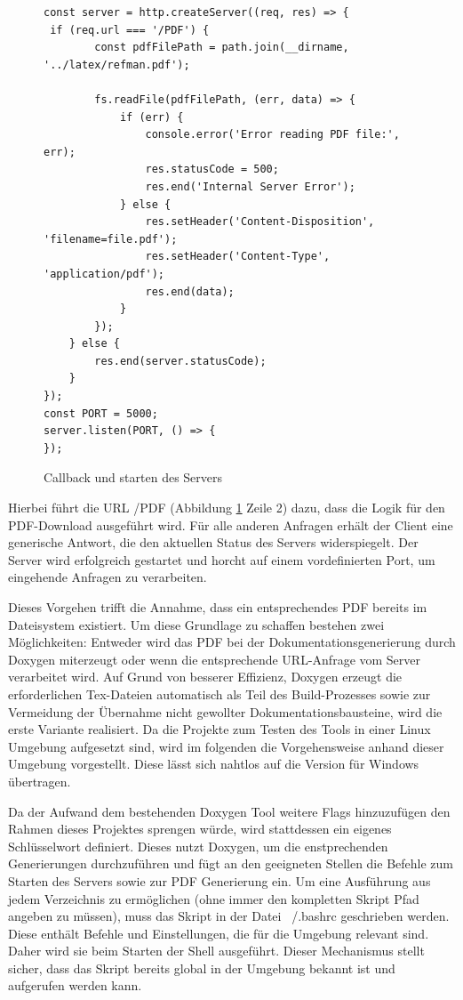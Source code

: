 \documentclass[11pt,a4paper]{report}
\begin{document}
\begin{figure}[H]
    \centering
    \begin{verbatim}
const server = http.createServer((req, res) => {
 if (req.url === '/PDF') {
        const pdfFilePath = path.join(__dirname, '../latex/refman.pdf');

        fs.readFile(pdfFilePath, (err, data) => {
            if (err) {
                console.error('Error reading PDF file:', err);
                res.statusCode = 500;
                res.end('Internal Server Error');
            } else {
                res.setHeader('Content-Disposition', 'filename=file.pdf');
                res.setHeader('Content-Type', 'application/pdf');
                res.end(data);
            }
        });
    } else {
        res.end(server.statusCode);
    }
});
const PORT = 5000;
server.listen(PORT, () => {
});
    \end{verbatim}
    \caption{Callback und starten des Servers}
    \label{code:Callback}
\end{figure}
\noindent
Hierbei führt die URL \glqq /PDF \grqq{} (Abbildung \ref{code:Callback} Zeile 2) dazu, dass die Logik für den PDF-Download ausgeführt wird. Für alle anderen Anfragen erhält der Client eine generische Antwort, die den aktuellen Status des Servers widerspiegelt. Der Server wird erfolgreich gestartet und horcht auf einem vordefinierten Port, um eingehende Anfragen zu verarbeiten.

\noindent
Dieses Vorgehen trifft die Annahme, dass ein entsprechendes PDF bereits im Dateisystem existiert. Um diese Grundlage zu schaffen bestehen zwei Möglichkeiten: Entweder wird das PDF bei der Dokumentationsgenerierung durch Doxygen miterzeugt oder wenn die entsprechende URL-Anfrage vom Server verarbeitet wird. Auf Grund von besserer Effizienz, Doxygen erzeugt die erforderlichen \glqq Tex\grqq{}-Dateien automatisch als Teil des Build-Prozesses sowie zur Vermeidung der Übernahme nicht gewollter Dokumentationsbausteine, wird die erste Variante realisiert. Da die Projekte zum Testen des Tools in einer \glqq Linux \grqq{} Umgebung aufgesetzt sind, wird im folgenden die Vorgehensweise anhand dieser Umgebung vorgestellt. Diese lässt sich nahtlos auf die Version für \glqq Windows \grqq{} übertragen.

\noindent
Da der Aufwand dem bestehenden Doxygen Tool weitere Flags hinzuzufügen den Rahmen dieses Projektes sprengen würde, wird stattdessen ein eigenes Schlüsselwort definiert. Dieses nutzt Doxygen, um die enstprechenden Generierungen durchzuführen und fügt an den geeigneten Stellen die Befehle zum Starten des Servers sowie zur PDF Generierung ein. Um eine Ausführung aus jedem Verzeichnis zu ermöglichen (ohne immer den kompletten Skript Pfad angeben zu müssen), muss das Skript in der Datei \glqq ~/.bashrc \grqq{} geschrieben werden. Diese enthält Befehle und Einstellungen, die für die Umgebung relevant sind. Daher wird sie beim Starten der Shell ausgeführt. Dieser Mechanismus stellt sicher, dass das Skript bereits global in der Umgebung bekannt ist und aufgerufen werden kann.
\end{document}
